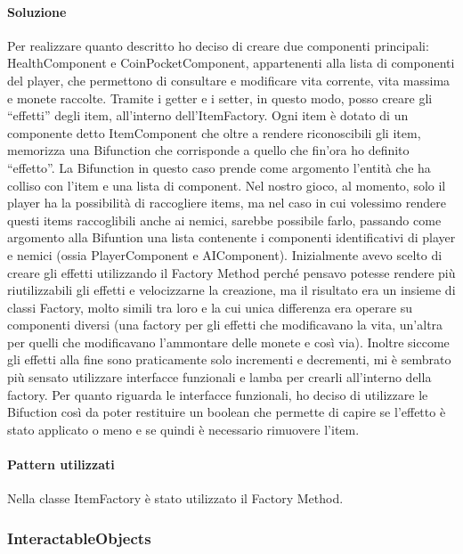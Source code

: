 \documentclass[a4paper,12pt]{report}
\begin{document}
\paragraph*{Soluzione}
	Per realizzare quanto descritto ho deciso di creare due componenti principali: HealthComponent e CoinPocketComponent, appartenenti alla lista di componenti del player, che permettono di consultare e modificare vita corrente, vita massima e monete raccolte. Tramite i getter e i setter, in questo modo, posso creare gli “effetti” degli item, all'interno dell'ItemFactory.  Ogni item è dotato di un componente detto ItemComponent che oltre a rendere riconoscibili gli item, memorizza una Bifunction che corrisponde a quello che fin'ora ho definito “effetto”. La Bifunction in questo caso prende come argomento l'entità che ha colliso con l'item e una lista di component. Nel nostro gioco, al momento, solo il player ha la possibilità di raccogliere items, ma nel caso in cui volessimo rendere questi items raccoglibili anche ai nemici, sarebbe possibile farlo, passando come argomento alla Bifuntion una lista contenente i componenti identificativi di player e nemici (ossia PlayerComponent e AIComponent).
	Inizialmente avevo scelto di creare gli effetti utilizzando il Factory Method perché pensavo potesse rendere più riutilizzabili gli effetti e velocizzarne la creazione, ma il risultato era un insieme di classi Factory, molto simili tra loro e la cui unica differenza era operare su componenti diversi (una factory per gli effetti che modificavano la vita, un'altra per quelli che modificavano l'ammontare delle monete e così via).
	Inoltre siccome gli effetti alla fine sono praticamente solo incrementi e decrementi, mi è sembrato più sensato utilizzare interfacce funzionali e lamba per crearli all'interno della factory. 
	Per quanto riguarda le interfacce funzionali, ho deciso di utilizzare le Bifuction così da poter restituire un boolean che permette di capire se l'effetto è stato applicato o meno e se quindi è necessario rimuovere l'item.


\paragraph*{Pattern utilizzati}
	Nella classe ItemFactory è stato utilizzato il Factory Method.

\subsubsection*{InteractableObjects}
\end{document}
